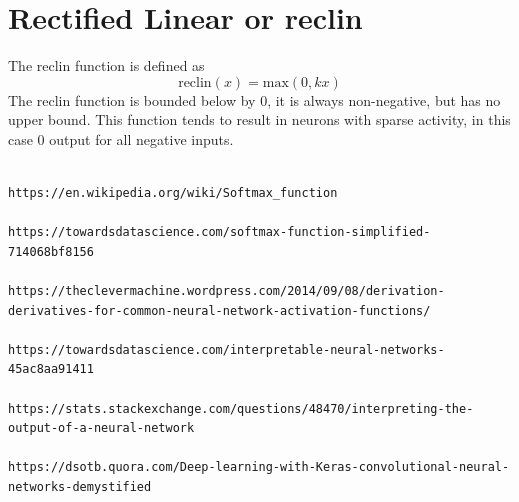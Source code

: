 \section{Rectified Linear or reclin}

The reclin function is defined as 
\begin{equation}
\textrm{reclin}(x) = \textrm{max}(0,kx)
\end{equation}
The reclin function is bounded below by 0, it is always non-negative, but has no upper bound.  This function tends to result in neurons with sparse activity, in this case 0 output for all negative inputs.


\begin{lstlisting}

https://en.wikipedia.org/wiki/Softmax_function

https://towardsdatascience.com/softmax-function-simplified-714068bf8156

https://theclevermachine.wordpress.com/2014/09/08/derivation-derivatives-for-common-neural-network-activation-functions/

https://towardsdatascience.com/interpretable-neural-networks-45ac8aa91411

https://stats.stackexchange.com/questions/48470/interpreting-the-output-of-a-neural-network

https://dsotb.quora.com/Deep-learning-with-Keras-convolutional-neural-networks-demystified
\end{lstlisting} 